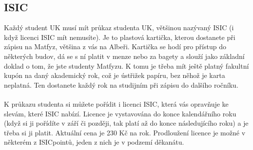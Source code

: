 \subsection{ISIC}
Každý student UK musí mít průkaz studenta UK, většinou nazývaný ISIC (i když
licenci ISIC mít nemusíte). Je to plastová kartička, kterou dostanete při zápisu
na Matfyz, většina z vás na Albeři. Kartička se hodí pro přístup do některých
budov, dá se s ní platit v menze nebo za bagety a slouží jako základní doklad o
tom, že jste studenty Matfyzu. K tomu je třeba mít ještě platný fakultní kupón
na daný akademický rok, což je ústřižek papíru, bez něhož je karta neplatná. Ten
dostanete každý rok na studijním při zápisu do dalšího ročníku.
\\\\
K průkazu studenta si můžete pořídit i licenci ISIC, která vás opravňuje ke
slevám, které ISIC nabízí. Licence je vystavována do konce kalendářního roku
(když si ji pořídíte v září či později, tak platí až do konce následujícího
roku) a je třeba si ji platit. Aktuální cena je 230 Kč na rok. Prodloužení
licence je možné v některém z ISICpointů, jeden z nich je v podzemí děkanátu.